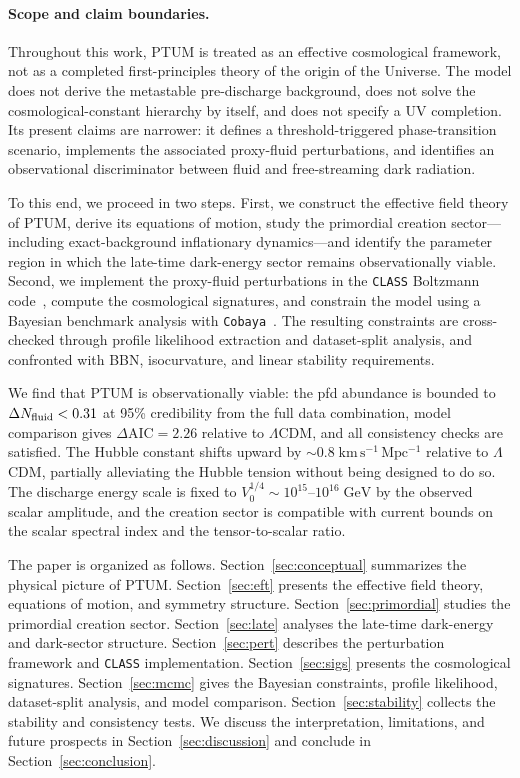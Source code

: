 \documentclass[epj]{svjour}
\begin{document}
\paragraph{Scope and claim boundaries.}
Throughout this work, PTUM is treated as an effective cosmological framework,
not as a completed first-principles theory of the origin of the Universe. The
model does not derive the metastable pre-discharge background, does not solve
the cosmological-constant hierarchy by itself, and does not specify a UV
completion. Its present claims are narrower: it defines a threshold-triggered
phase-transition scenario, implements the associated proxy-fluid perturbations,
and identifies an observational discriminator between fluid and free-streaming
dark radiation.


To this end, we proceed in two steps. First, we construct the
effective field theory of PTUM, derive its equations of motion, study
the primordial creation sector---including exact-background
inflationary dynamics---and identify the parameter region in which the
late-time dark-energy sector remains observationally viable. Second,
we implement the proxy-fluid perturbations in the \texttt{CLASS}
Boltzmann code~\cite{Blas2011,Lesgourgues2011}, compute the
cosmological signatures, and constrain the model using a Bayesian benchmark
analysis with \texttt{Cobaya}~\cite{Torrado2021}. The resulting
constraints are cross-checked through profile likelihood extraction
and dataset-split analysis, and confronted with BBN, isocurvature, and
linear stability requirements.

We find that PTUM is observationally viable: the pfd abundance is
bounded to $\Delta N_{\rm fluid}<0.31$ at 95\% credibility from the
full data combination, model comparison gives
$\Delta\mathrm{AIC}=2.26$ relative to $\Lambda$CDM, and all
consistency checks are satisfied. The Hubble constant shifts upward by
$\sim\!0.8\;\mathrm{km\,s^{-1}\,Mpc^{-1}}$ relative to $\Lambda$CDM,
partially alleviating the Hubble tension without being designed to do
so. The discharge energy scale is fixed to
$V_0^{1/4}\sim 10^{15}$--$10^{16}\;\mathrm{GeV}$ by the observed
scalar amplitude, and the creation sector is compatible with current
bounds on the scalar spectral index and the tensor-to-scalar ratio.

The paper is organized as follows.
Section~\ref{sec:conceptual} summarizes the physical picture of PTUM.
Section~\ref{sec:eft} presents the effective field theory,
equations of motion, and symmetry structure.
Section~\ref{sec:primordial} studies the primordial creation sector.
Section~\ref{sec:late} analyses the late-time dark-energy and
dark-sector structure.
Section~\ref{sec:pert} describes the perturbation framework and
\texttt{CLASS} implementation.
Section~\ref{sec:sigs} presents the cosmological signatures.
Section~\ref{sec:mcmc} gives the Bayesian constraints, profile
likelihood, dataset-split analysis, and model comparison.
Section~\ref{sec:stability} collects the stability and consistency
tests.
We discuss the interpretation, limitations, and future prospects in
Section~\ref{sec:discussion} and conclude in
Section~\ref{sec:conclusion}.
\end{document}
